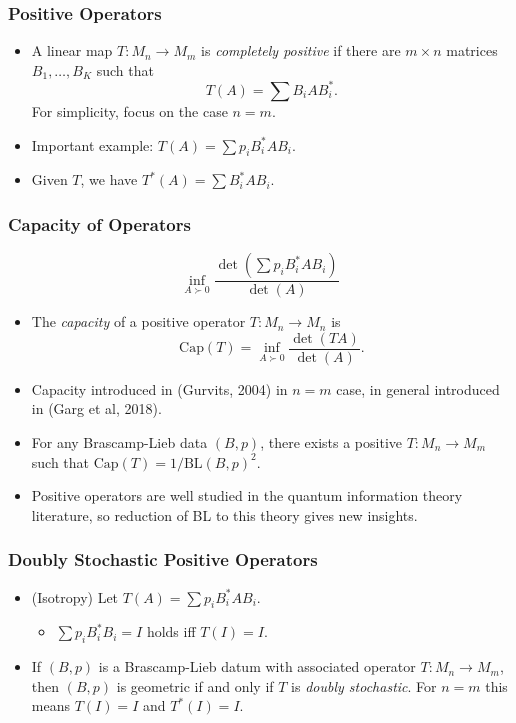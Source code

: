 \documentclass[usenames,dvipsnames,12pt]{beamer}
\begin{document}
\begin{frame}
    \frametitle{Positive Operators}

    \begin{itemize}
        \item A linear map $T: M_n \to M_m$ is \emph{completely positive} if there are $m \times n$ matrices $B_1,\dots,B_K$ such that
        \[ T(A) = \sum B_i A B_i^*. \]
        For simplicity, focus on the case $n = m$.

        \pause
        \item Important example: $T(A) = \sum p_i B_i^* A B_i$.

        \pause
        \item Given $T$, we have $T^*(A) = \sum B_i^* A B_i$.
    \end{itemize}
\end{frame}

\begin{frame}
    \frametitle{Capacity of Operators}

    \[ \inf_{A \succ 0} \frac{\det(\sum p_i B_i^* A B_i)}{\det(A)}  \]

    \begin{itemize}
        \pause
        \item The \emph{capacity} of a positive operator $T: M_n \to M_n$ is
        \[ \text{Cap}(T) = \inf_{A \succ 0} \frac{\det(TA)}{\det(A)}. \]

        \pause
        \item Capacity introduced in (Gurvits, 2004) in $n = m$ case, in general introduced in (Garg et al, 2018).

        \pause
        \item For any Brascamp-Lieb data $(B,p)$, there exists a positive $T: M_n \to M_m$ such that $\text{Cap}(T) = 1/\text{BL}(B,p)^2$.

        \pause
        \item Positive operators are well studied in the quantum information theory literature, so reduction of BL to  this theory gives new insights.
    \end{itemize}
\end{frame}

\begin{frame}
    \frametitle{Doubly Stochastic Positive Operators}

    \begin{itemize}
        \item (Isotropy) Let $T(A) = \sum p_i B_i^* A B_i$.
        \begin{itemize}
            \pause
            \item $\sum p_i B_i^* B_i = I$ holds iff $T(I) = I$.
        \end{itemize}

        \pause
        \item If $(B,p)$ is a Brascamp-Lieb datum with associated operator $T: M_n \to M_m$, then $(B,p)$ is geometric if and only if $T$ is \emph{doubly stochastic}. For $n = m$ this means $T(I) = I$ and $T^*(I) = I$.
    \end{itemize}
\end{frame}
\end{document}
